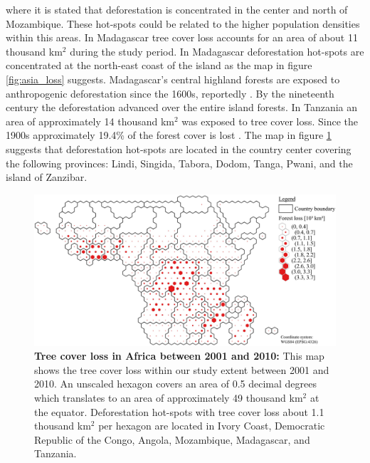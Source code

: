 where it is stated that deforestation is concentrated in the center and north of Mozambique. These hot-spots could be related to the higher population densities within this areas. In Madagascar tree cover loss accounts for an area of about 11 thousand km$^2$ during the study period. In Madagascar deforestation hot-spots are concentrated at the north-east coast of the island as the map in figure \ref{fig:asia_loss} suggests. Madagascar's central highland forests are exposed to anthropogenic deforestation since the 1600s, reportedly \citep{Harper2007}. By the nineteenth century the deforestation advanced over the entire island forests. In Tanzania an area of approximately 14 thousand km$^2$ was exposed to tree cover loss. Since the 1900s approximately 19.4\% of the forest cover is lost \citep{Kideghesho2015}. The map in figure \ref{fig:africa_loss} suggests that deforestation hot-spots are located in the country center covering the following provinces: Lindi, Singida, Tabora, Dodom, Tanga, Pwani, and the island of Zanzibar.
			\begin{figure}[ht]
				\centering
				\includegraphics[scale=1.]{img/africa_loss_frameless}
				\caption[Tree cover loss in Africa between 2001 and 2010]{\textbf{Tree cover loss in Africa between 2001 and 2010:} This map shows the tree cover loss within our study extent between 2001 and 2010. An unscaled hexagon covers an area of 0.5 decimal degrees which translates to an area of approximately 49 thousand km$^2$ at the equator. Deforestation hot-spots with tree cover loss about 1.1 thousand km$^2$ per hexagon are located in Ivory Coast, Democratic Republic of the Congo, Angola, Mozambique, Madagascar, and Tanzania.}
				\label{fig:africa_loss}
			\end{figure}

